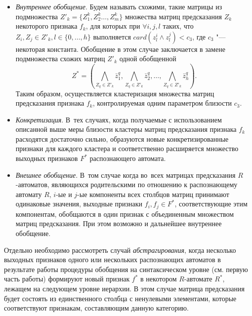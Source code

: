 \documentclass[a4paper, 12pt]{article}
\theoremstyle{break}
\numberwithin{equation}{section}
\begin{document}
	\begin{itemize}
		\item \textit{Внутреннее обобщение}. Будем называть схожими, такие матрицы из подмножества $Z'_k=\{Z_1^k,Z_2^k\dots,Z_m^k\}$ множества матриц предсказания $Z_k$ некоторого признака $f_k$, для которых при $\forall i,j,l$ таких, что $Z_i,Z_j\in Z'_k,l\in\{0,\dots,h\}$ выполняется $card(z_l^i\wedge z_l^j)<c_3$, где $c_3$ "--- некоторая константа. Обобщение в этом случае заключается в замене подмножества схожих матриц $Z'_k$ одной обобщенной
		\begin{equation*}
			Z^*=(\bigwedge\limits_{Z_q\in Z'_k}\bar z_1^q,\bigwedge\limits_{Z_q\in Z'_k}\bar z_2^q,\dots,\bigwedge\limits_{Z_q\in Z'_k}\bar z_h^q).
		\end{equation*}
		Таким образом, осуществляется кластеризация множества матриц предсказания признака $f_k$, контролируемая одним параметром близости $c_3$.
		\item \textit{Конкретизация}. В~тех случаях, когда получаемые с использованием описанной выше меры близости кластеры матриц предсказания признака $f_k$ расходятся достаточно сильно, образуются новые конкретизированные признаки для каждого кластера и соответственно расширяется множество выходных признаков $F^*$ распознающего автомата.
		\item \textit{Внешнее обобщение}. В~том случае когда во~всех матрицах предсказания $R$-автоматов, являющихся родительскими по отношению к распознающему автомату $R$, $i$-ые и $j$-ые компоненты всех столбцов матриц принимают одинаковые значения, выходные признаки $f_i,f_j\in F^*$, соответствующие этим компонентам, обобщаются в один признак с объединенным множеством матриц предсказания. При этом возможно и дальнейшее внутреннее обобщение.
	\end{itemize}
	
	Отдельно необходимо рассмотреть случай \textit{абстрагирования}, когда несколько выходных признаков одного или нескольких распознающих автоматов в результате работы процедуры обобщения на синтаксическом уровне (см. первую часть работы) формируют новый признак $f^*$ в некотором $R$-автомате $R^*$, лежащем на следующем уровне иерархии. В этом случае матрица предсказания будет состоять из единственного столбца с ненулевыми элементами, которые соответствуют признакам, составляющим данную категорию.
	
\end{document}
